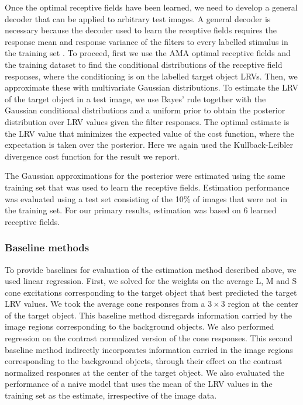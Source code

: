 \documentclass{jov}
\begin{document}
Once the optimal receptive fields have been learned, we need to develop a general decoder that can be applied to arbitrary test images.
A general decoder is necessary because the decoder used to learn the receptive fields requires the response mean and response variance of the filters to every labelled stimulus in the training set \cite{geisler2009optimal,burge2017accuracy}.
To proceed, first we use the AMA optimal receptive fields and the training dataset to find the conditional distributions of the receptive field responses, where the conditioning is on the labelled target object LRVs.
Then, we approximate these with multivariate Gaussian distributions.
To estimate the LRV of the target object in a test image, we use Bayes' rule together with the Gaussian conditional distributions and a uniform prior to obtain the posterior distribution over LRV values given the filter responses.
The optimal estimate is the LRV value that minimizes the expected value of the cost function, where the expectation is taken over the posterior.
Here we again used the Kullback-Leibler divergence cost function for the result we report.

The Gaussian approximations for the posterior were estimated using the same training set that was used to learn the receptive fields.
Estimation performance was evaluated using a test set consisting of the 10\% of images that were not in the training set.
For our primary results, estimation was based on 6 learned receptive fields.

\subsubsection*{Baseline methods}
To provide baselines for evaluation of the estimation method described above, we used linear regression.
First, we solved for the weights on the average L, M and S cone excitations corresponding to the target object that best predicted the target LRV values.
We took the average cone responses from a $3 \times 3$ region at the center of the target object.
This baseline method disregards information carried by the image regions corresponding to the background objects.
We also performed regression on the contrast normalized version of the cone responses.
This second baseline method indirectly incorporates information carried in the image regions corresponding to the background objects,
through their effect on the contrast normalized responses at the center of the target object. 
We also evaluated the performance of a naive model that uses the mean of the LRV values in the training set as the estimate, irrespective
of the image data.
\end{document}
